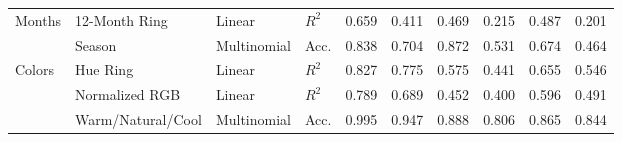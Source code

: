 \begin{table}[htbp]
{\begin{tabular}{ll ll rr rr rr}
\midrule
\multirow{2}{*}{Months} & 12-Month Ring & Linear & $R^2$ & 0.659 & 0.411 & 0.469 & 0.215 & 0.487 & 0.201 \\
 & Season & Multinomial & Acc. & 0.838 & 0.704 & 0.872 & 0.531 & 0.674 & 0.464 \\
\midrule
\multirow{3}{*}{Colors} & Hue Ring & Linear & $R^2$ & 0.827 & 0.775 & 0.575 & 0.441 & 0.655 & 0.546 \\
 & Normalized RGB & Linear & $R^2$ & 0.789 & 0.689 & 0.452 & 0.400 & 0.596 & 0.491 \\
 & Warm/Natural/Cool & Multinomial & Acc. & 0.995 & 0.947 & 0.888 & 0.806 & 0.865 & 0.844 \\
\bottomrule
\end{tabular}
}%
\end{table}